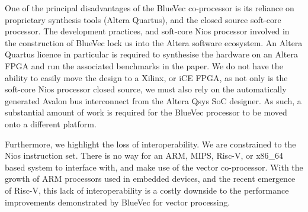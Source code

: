 \documentclass[a4paper,8pt]{report}
\begin{document}
One of the principal disadvantages of the BlueVec co-processor is its reliance
on proprietary synthesis tools (Altera Quartus), and the closed source soft-core
processor. The development practices, and soft-core Nios processor involved in
the construction of BlueVec lock us into the Altera software ecosystem. An
Altera Quartus licence in particular is required to synthesise the hardware on
an Altera FPGA and run the associated benchmarks in the paper. We do not have
the ability to easily move the design to a Xilinx, or iCE FPGA, as not only is
the soft-core Nios processor closed source, we must also rely on the
automatically generated Avalon bus interconnect from the Altera Qsys SoC
designer. As such, a substantial amount of work is required for the BlueVec
processor to be moved onto a different platform.


Furthermore, we highlight the loss of interoperability. We are constrained to the
Nios instruction set. There is no way for an ARM, MIPS, Risc-V, or x86\_64 based
system to interface with, and make use of the vector co-processor. With the
growth of ARM processors used in embedded devices, and the recent emergence of
Risc-V, this lack of interoperability is a costly downside to the performance
improvements demonstrated by BlueVec for vector processing.







\end{document}
